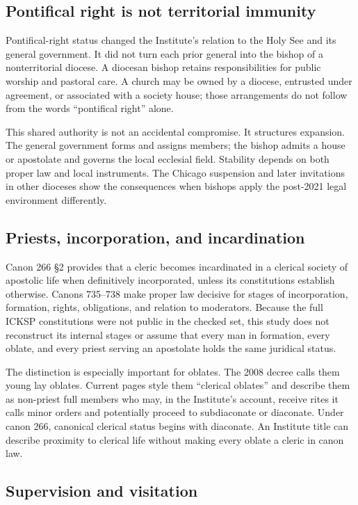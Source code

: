 \subsection{Pontifical right is not territorial immunity}

Pontifical-right status changed the Institute's relation to the Holy See and its general government. It did not turn each prior general into the bishop of a nonterritorial diocese. A diocesan bishop retains responsibilities for public worship and pastoral care. A church may be owned by a diocese, entrusted under agreement, or associated with a society house; those arrangements do not follow from the words ``pontifical right'' alone.

This shared authority is not an accidental compromise. It structures expansion. The general government forms and assigns members; the bishop admits a house or apostolate and governs the local ecclesial field. Stability depends on both proper law and local instruments. The Chicago suspension and later invitations in other dioceses show the consequences when bishops apply the post-2021 legal environment differently.

\subsection{Priests, incorporation, and incardination}

Canon 266 §2 provides that a cleric becomes incardinated in a clerical society of apostolic life when definitively incorporated, unless its constitutions establish otherwise. Canons 735--738 make proper law decisive for stages of incorporation, formation, rights, obligations, and relation to moderators. Because the full ICKSP constitutions were not public in the checked set, this study does not reconstruct its internal stages or assume that every man in formation, every oblate, and every priest serving an apostolate holds the same juridical status.

The distinction is especially important for oblates. The 2008 decree calls them young lay oblates. Current pages style them ``clerical oblates'' and describe them as non-priest full members who may, in the Institute's account, receive rites it calls minor orders and potentially proceed to subdiaconate or diaconate. Under canon 266, canonical clerical status begins with diaconate. An Institute title can describe proximity to clerical life without making every oblate a cleric in canon law.

\subsection{Supervision and visitation}

